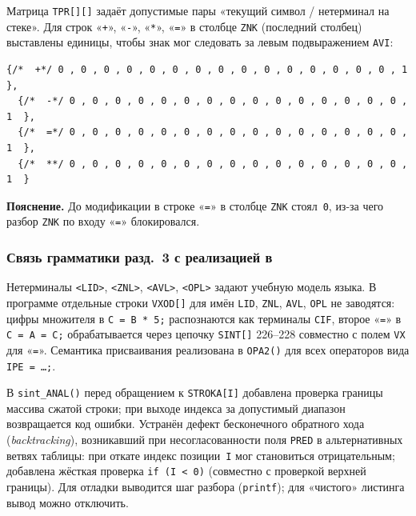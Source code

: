 \documentclass[a4paper,14pt]{extarticle}
\newcommand{\fpath}[1]{\texttt{\detokenize{#1}}}
\begin{document}
Матрица \texttt{TPR[][]} задаёт допустимые пары «текущий символ / нетерминал на
стеке». Для строк «\texttt{+}», «\texttt{-}», «\texttt{*}», «\texttt{=}» в столбце
\texttt{ZNK} (последний столбец) выставлены единицы, чтобы знак мог следовать за
левым подвыражением \texttt{AVI}:

\begin{lstlisting}[style=Cstyle,caption={Фрагмент \texttt{TPR[][]}: столбец \texttt{ZNK} для знаков операций},label=lst:tpr]
  {/*  +*/ 0 , 0 , 0 , 0 , 0 , 0 , 0 , 0 , 0 , 0 , 0 , 0 , 0 , 0 , 0 , 1  },
  {/*  -*/ 0 , 0 , 0 , 0 , 0 , 0 , 0 , 0 , 0 , 0 , 0 , 0 , 0 , 0 , 0 , 1  },
  {/*  =*/ 0 , 0 , 0 , 0 , 0 , 0 , 0 , 0 , 0 , 0 , 0 , 0 , 0 , 0 , 0 , 1  },
  {/*  **/ 0 , 0 , 0 , 0 , 0 , 0 , 0 , 0 , 0 , 0 , 0 , 0 , 0 , 0 , 0 , 1  }
\end{lstlisting}
\textbf{Пояснение.} До модификации в строке «\texttt{=}» в столбце \texttt{ZNK}
стоял~\texttt{0}, из-за чего разбор \texttt{ZNK} по входу «\texttt{=}» блокировался.

\subsubsection*{Связь грамматики разд.~3 с реализацией в \fpath{komppl.c}}

Нетерминалы \texttt{<LID>}, \texttt{<ZNL>}, \texttt{<AVL>}, \texttt{<OPL>} задают
учебную модель языка. В программе отдельные строки \texttt{VXOD[]} для имён
\texttt{LID}, \texttt{ZNL}, \texttt{AVL}, \texttt{OPL} не заводятся: цифры
множителя в \texttt{C = B * 5;} распознаются как терминалы \texttt{CIF}, второе
«\texttt{=}» в \texttt{C = A = C;} обрабатывается через цепочку \texttt{SINT[]}
226--228 совместно с полем \texttt{VX} для «\texttt{=}». Семантика присваивания
реализована в \texttt{OPA2()} для всех операторов вида \texttt{IPE = \ldots;}.

В \texttt{sint\_ANAL()} перед обращением к \texttt{STROKA[I]} добавлена проверка
границы массива сжатой строки; при выходе индекса за допустимый диапазон возвращается
код ошибки. Устранён дефект бесконечного обратного хода (\emph{backtracking}),
возникавший при несогласованности поля \texttt{PRED} в альтернативных ветвях
таблицы: при откате индекс позиции~\texttt{I} мог становиться отрицательным;
добавлена жёсткая проверка \texttt{if~(I~<~0)} (совместно с проверкой верхней
границы). Для отладки выводится шаг разбора (\texttt{printf}); для «чистого»
листинга вывод можно отключить.

\end{document}
